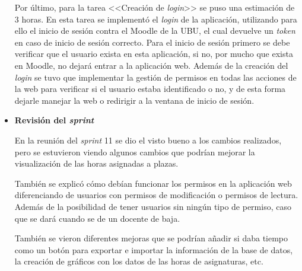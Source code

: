 \begin{itemize}
Por último, para la tarea <<Creación de \textit{login}>> se puso una estimación de 3 horas.
En esta tarea se implementó el \textit{login} de la aplicación, utilizando para ello el inicio de sesión contra el Moodle de la UBU, el cual devuelve un \textit{token} en caso de inicio de sesión correcto.
Para el inicio de sesión primero se debe verificar que el usuario exista en esta aplicación, si no, por mucho que exista en Moodle, no dejará entrar a la aplicación web.
Además de la creación del \textit{login} se tuvo que implementar la gestión de permisos en todas las acciones de la web para verificar si el usuario estaba identificado o no, y de esta forma dejarle manejar la web o redirigir a la ventana de inicio de sesión.

\item\textbf{Revisión del \textit{sprint}}

En la reunión del \textit{sprint} 11 se dio el visto bueno a los cambios realizados, pero se estuvieron viendo algunos cambios que podrían mejorar la visualización de las horas asignadas a plazas.

También se explicó cómo debían funcionar los permisos en la aplicación web diferenciando de usuarios con permisos de modificación o permisos de lectura. Además de la posibilidad de tener usuarios sin ningún tipo de permiso, caso que se dará cuando se de un docente de baja.

También se vieron diferentes mejoras que se podrían añadir si daba tiempo como un botón para exportar e importar la información de la base de datos, la creación de gráficos con los datos de las horas de asignaturas, etc.
\end{itemize}


